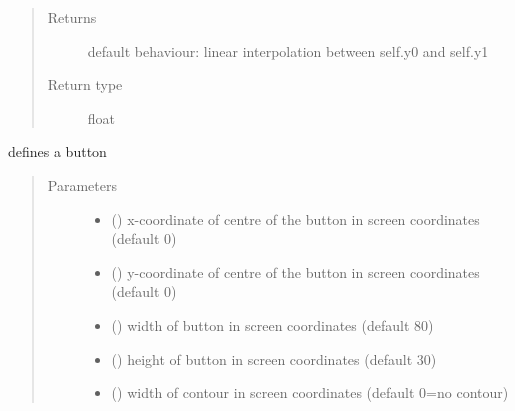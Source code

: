 \documentclass[letterpaper,10pt,english]{sphinxmanual}
\begin{document}
\begin{fulllineitems}
\begin{fulllineitems}
\begin{quote}
\begin{description}
\item[{Returns}] \leavevmode
{} \textendash{} default behaviour: linear interpolation between self.y0 and self.y1

\item[{Return type}] \leavevmode
float

\end{description}\end{quote}

\end{fulllineitems}


\end{fulllineitems}


\begin{fulllineitems}
\label{\detokenize{Reference:salabim.AnimateButton}}
defines a button
\begin{quote}\begin{description}
\item[{Parameters}] \leavevmode\begin{itemize}
\item {} 
 () \textendash{} x-coordinate of centre of the button in screen coordinates (default 0)

\item {} 
 () \textendash{} y-coordinate of centre of the button in screen coordinates (default 0)

\item {} 
 () \textendash{} width of button in screen coordinates (default 80)

\item {} 
 () \textendash{} height of button in screen coordinates (default 30)

\item {} 
 () \textendash{} width of contour in screen coordinates (default 0=no contour)


\end{itemize}
\end{description}
\end{quote}
\end{fulllineitems}
\end{document}
